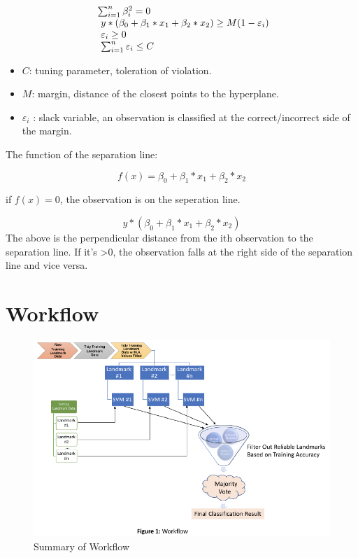 \documentclass[10pt,letterpaper]{article}
\providecommand{\tightlist}{%
  \setlength{\itemsep}{0pt}\setlength{\parskip}{0pt}}
\begin{document}
\begin{equation}
  \left.
  \begin{array}{l@{\,}l}
     \sum_{i=1}^n \beta_i^2 = 0 \\
     \ y * ( \beta_0 + \beta_1 * x_1 + \beta_2 * x_2 ) \geq M(1-\varepsilon_i) \\
     \ \varepsilon_i \geq 0 \\
     \ \sum_{i=1}^n \varepsilon_i \leq C \\
  \end{array}
  \right.
\end{equation}

\begin{itemize}
\tightlist
\item
  \(C\): tuning parameter, toleration of violation.
\item
  \(M\): margin, distance of the closest points to the hyperplane.
\item
  \(\varepsilon_i\) : slack variable, an observation is classified at
  the correct/incorrect side of the margin.
\end{itemize}

The function of the separation line:

\[f(x) = \beta_0 + \beta_1 * x_1 + \beta_2 * x_2 \]

if \(f(x) = 0\), the observation is on the seperation line.

\[ y * ( \beta_0 + \beta_1 * x_1 + \beta_2 * x_2 )\] The above is the
perpendicular distance from the ith observation to the separation line.
If it's \textgreater{}0, the observation falls at the right side of the
separation line and vice versa.

\section{Workflow}\label{workflow}

\begin{figure}
\centering
\includegraphics{zebrafish_paper_files/figure-latex/workflow-1.pdf}
\caption{Summary of Workflow}
\end{figure}
\end{document}

